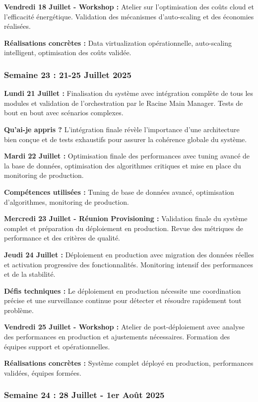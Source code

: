 \documentclass[a4paper,12pt]{article}
\begin{document}
\textbf{Vendredi 18 Juillet - Workshop :}
Atelier sur l'optimisation des coûts cloud et l'efficacité énergétique. Validation des mécanismes d'auto-scaling et des économies réalisées.

\textbf{Réalisations concrètes :} Data virtualization opérationnelle, auto-scaling intelligent, optimisation des coûts validée.

\subsubsection{Semaine 23 : 21-25 Juillet 2025}

\textbf{Lundi 21 Juillet :}
Finalisation du système avec intégration complète de tous les modules et validation de l'orchestration par le Racine Main Manager. Tests de bout en bout avec scénarios complexes.

\textbf{Qu'ai-je appris ?} L'intégration finale révèle l'importance d'une architecture bien conçue et de tests exhaustifs pour assurer la cohérence globale du système.

\textbf{Mardi 22 Juillet :}
Optimisation finale des performances avec tuning avancé de la base de données, optimisation des algorithmes critiques et mise en place du monitoring de production.

\textbf{Compétences utilisées :} Tuning de base de données avancé, optimisation d'algorithmes, monitoring de production.

\textbf{Mercredi 23 Juillet - Réunion Provisioning :}
Validation finale du système complet et préparation du déploiement en production. Revue des métriques de performance et des critères de qualité.

\textbf{Jeudi 24 Juillet :}
Déploiement en production avec migration des données réelles et activation progressive des fonctionnalités. Monitoring intensif des performances et de la stabilité.

\textbf{Défis techniques :} Le déploiement en production nécessite une coordination précise et une surveillance continue pour détecter et résoudre rapidement tout problème.

\textbf{Vendredi 25 Juillet - Workshop :}
Atelier de post-déploiement avec analyse des performances en production et ajustements nécessaires. Formation des équipes support et opérationnelles.

\textbf{Réalisations concrètes :} Système complet déployé en production, performances validées, équipes formées.

\subsubsection{Semaine 24 : 28 Juillet - 1er Août 2025}
\end{document}
